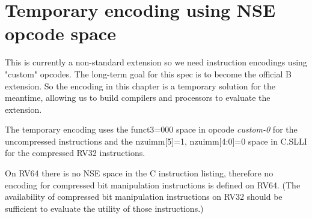 \chapter{Temporary encoding using NSE opcode space}

This is currently a non-standard extension so we need instruction encodings
using "custom" opcodes. The long-term goal for this spec is to become the
official B extension. So the encoding in this chapter is a temporary solution
for the meantime, allowing us to build compilers and processors to evaluate
the extension.

The temporary encoding uses the funct3=000 space in opcode {\it custom-0}
for the uncompressed instructions and the nzuimm[5]=1, nzuimm[4:0]=0 space
in C.SLLI for the compressed RV32 instructions.

On RV64 there is no NSE space in the C instruction listing, therefore no
encoding for compressed bit manipulation instructions is defined on RV64.  (The
availability of compressed bit manipulation instructions on RV32 should be
sufficient to evaluate the utility of those instructions.)

